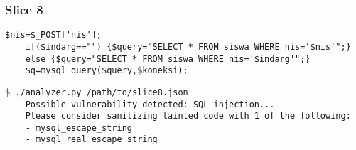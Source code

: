 \subsubsection*{Slice 8}
\label{sec:experimental.examples.slice08}

\begin{lstlisting}[label={php.slice08}]
    $nis=$_POST['nis'];
    if($indarg=="") {$query="SELECT * FROM siswa WHERE nis='$nis'";}
    else {$query="SELECT * FROM siswa WHERE nis='$indarg'";}
    $q=mysql_query($query,$koneksi);
\end{lstlisting}

\begin{lstlisting}[label={out.example.slice08},
        caption={Shortened example SQLI vulnerable slice analysis output}]
    $ ./analyzer.py /path/to/slice8.json
    Possible vulnerability detected: SQL injection...
    Please consider sanitizing tainted code with 1 of the following:
    - mysql_escape_string
    - mysql_real_escape_string
\end{lstlisting}
